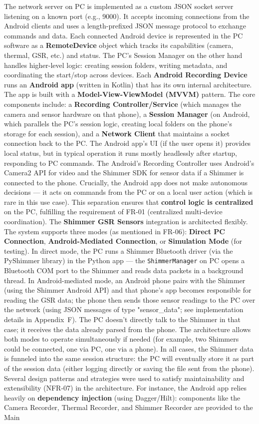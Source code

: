 The network server on PC is implemented as a custom JSON socket server listening on a known port (e.g., 9000). It accepts incoming connections from the Android clients and uses a length-prefixed JSON message protocol to exchange commands and data. Each connected Android device is represented in the PC software as a \textbf{RemoteDevice} object which tracks its capabilities (camera, thermal, GSR, etc.) and status. The PC's Session Manager on the other hand handles higher-level logic: creating session folders, writing metadata, and coordinating the start/stop across devices. Each \textbf{Android Recording Device} runs an \textbf{Android app} (written in Kotlin) that has its own internal architecture. The app is built with a \textbf{Model-View-ViewModel (MVVM)} pattern. The core components include: a \textbf{Recording Controller/Service} (which manages the camera and sensor hardware on that phone), a \textbf{Session Manager} (on Android, which parallels the PC's session logic, creating local folders on the phone's storage for each session), and a \textbf{Network Client} that maintains a socket connection back to the PC. The Android app's UI (if the user opens it) provides local status, but in typical operation it runs mostly headlessly after startup, responding to PC commands. The Android's Recording Controller uses Android's Camera2 API for video and the Shimmer SDK for sensor data if a Shimmer is connected to the phone. Crucially, the Android app does not make autonomous decisions --- it acts on commands from the PC or on a local user action (which is rare in this use case). This separation ensures that \textbf{control logic is centralized} on the PC, fulfilling the requirement of FR-01 (centralized multi-device coordination). The \textbf{Shimmer GSR Sensors} integration is architected flexibly. The system supports three modes (as mentioned in FR-06): \textbf{Direct PC Connection}, \textbf{Android-Mediated Connection}, or \textbf{Simulation Mode} (for testing). In direct mode, the PC runs a Shimmer Bluetooth driver (via the PyShimmer library) in the Python app --- the \texttt{ShimmerManager} on PC opens a Bluetooth COM port to the Shimmer and reads data packets in a background thread. In Android-mediated mode, an Android phone pairs with the Shimmer (using the Shimmer Android API) and that phone's app becomes responsible for reading the GSR data; the phone then sends those sensor readings to the PC over the network (using JSON messages of type "sensor\_data"; see implementation details in Appendix~F). The PC doesn't directly talk to the Shimmer in that case; it receives the data already parsed from the phone. The architecture allows both modes to operate simultaneously if needed (for example, two Shimmers could be connected, one via PC, one via a phone). In all cases, the Shimmer data is funneled into the same session structure: the PC will eventually store it as part of the session data (either logging directly or saving the file sent from the phone). Several design patterns and strategies were used to satisfy maintainability and extensibility (NFR-07) in the architecture. For instance, the Android app relies heavily on \textbf{dependency injection} (using Dagger/Hilt): components like the Camera Recorder, Thermal Recorder, and Shimmer Recorder are provided to the Main 